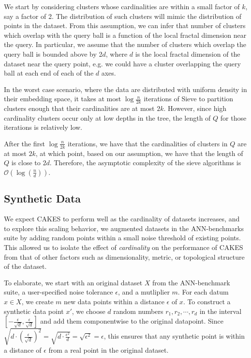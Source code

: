 We start by considering clusters whose cardinalities are within a small factor of $k$, say a factor of 2.
The distribution of such clusters will mimic the distribution of points in the dataset. 
From this assumption, we can infer that number of clusters which overlap with the query ball is a function of the local fractal dimension near the query.
In particular, we assume that the number of clusters which overlap the query ball is bounded above by 2$d$, where $d$ is the local fractal dimension of the dataset near the query point, e.g. we could have a cluster overlapping the query ball at each end of each of the $d$ axes.

In the worst case scenario, where the data are distributed with uniform density in their embedding space, it takes at most $\log{\frac{n}{2k}}$ iterations of Sieve to partition clusters enough that their cardinalities are at most $2k$.
However, since high cardinality clusters occur only at low depths in the tree, the length of $Q$ for those iterations is relatively low. 

After the first $\log{\frac{n}{2k}}$ iterations, we have that the cardinalities of clusters in $Q$ are at most $2k$, at which point, based on our assumption, we have that the length of $Q$ is close to $2d$.
Therefore, the asymptotic complexity of the sieve algorithms is $\mathcal{O}\left(\log(\frac{n}{d})\right)$.

\subsection{Synthetic Data}
\label{subsec:methods:synthetic-data}

We expect CAKES to perform well as the cardinality of datasets increases, and to explore this scaling behavior, we augmented datasets in the ANN-benchmarks suite by adding random points within a 
small noise threshold of existing points. This allowed us to isolate the effect of \emph{cardinality} on the performance of CAKES 
from that of other factors such as dimensionality, metric, or topological structure of the dataset. 


To elaborate, we start with an original dataset $X$ from the ANN-benchmark suite, a user-specified noise tolerance $\epsilon$, and a mutliplier $m$.
For each datum $x \in X$, we create $m$ new data points within a distance $\epsilon$ of $x$. To construct a synthetic data point $x'$, we choose $d$ random numbers 
$r_1, r_2, \cdots , r_d$ in the interval $[-\tfrac{\epsilon}{\sqrt{d}}, \tfrac{\epsilon}{\sqrt{d}}]$ and add them componentwise to the original datapoint. 
Since $\sqrt{d \cdot (\tfrac{\epsilon}{\sqrt{d}})^2 } = \sqrt{d \cdot \tfrac{\epsilon^2}{d}}  = \sqrt{\epsilon^2} = \epsilon$, this ensures that any synthetic point is within a distance of $\epsilon$ from a real point in the original dataset.
